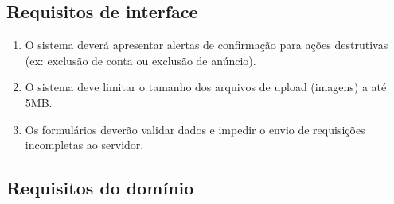 \documentclass[
	article,			%
	11pt,				%
	oneside,			%
	a4paper,			%
	english,			%
	brazil,				%
	sumario=tradicional
	]{abntex2}
\begin{document}
\subsection{Requisitos de interface}
\label{RequisitosInterface}

\begin{enumerate}[label=RI\arabic*:]

    \item O sistema deverá apresentar alertas de confirmação para ações destrutivas (ex: exclusão de conta ou exclusão de anúncio).

    \item O sistema deve limitar o tamanho dos arquivos de upload (imagens) a até 5MB.

    \item Os formulários deverão validar dados e impedir o envio de requisições incompletas ao servidor.

\end{enumerate}

\subsection{Requisitos do domínio}
\label{RequisitosDominio}
\end{document}
